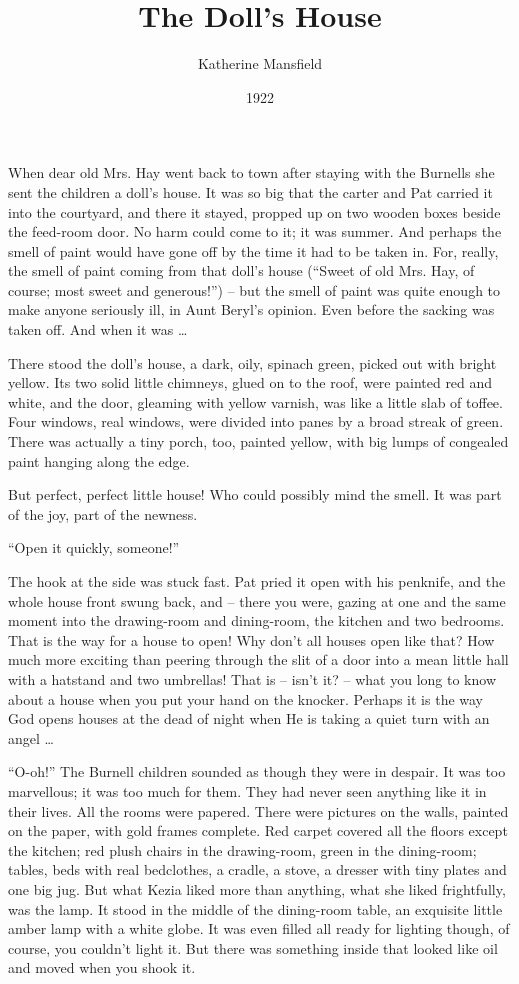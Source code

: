 \documentclass[10pt,a4paper]{article}
\begin{document}
\title{The Doll’s House}
\date{1922}
\author{Katherine Mansfield}
\maketitle


\linenumbers
When dear old Mrs. Hay went back to town after staying with the Burnells she sent the children a doll’s house. It was so big that the carter and Pat carried it into the courtyard, and there it stayed, propped up on two wooden boxes beside the feed-room door. No harm could come to it; it was summer. And perhaps the smell of paint would have gone off by the time it had to be taken in. For, really, the smell of paint coming from that doll’s house (“Sweet of old Mrs. Hay, of course; most sweet and generous!”) – but the smell of paint was quite enough to make anyone seriously ill, in Aunt Beryl’s opinion. Even before the sacking was taken off. And when it was …

There stood the doll’s house, a dark, oily, spinach green, picked out with bright yellow. Its two solid little chimneys, glued on to the roof, were painted red and white, and the door, gleaming with yellow varnish, was like a little slab of toffee. Four windows, real windows, were divided into panes by a broad streak of green. There was actually a tiny porch, too, painted yellow, with big lumps of congealed paint hanging along the edge.

But perfect, perfect little house! Who could possibly mind the smell. It was part of the joy, part of the newness.

“Open it quickly, someone!”

The hook at the side was stuck fast. Pat pried it open with his penknife, and the whole house front swung back, and – there you were, gazing at one and the same moment into the drawing-room and dining-room, the kitchen and two bedrooms. That is the way for a house to open! Why don’t all houses open like that? How much more exciting than peering through the slit of a door into a mean little hall with a hatstand and two umbrellas! That is – isn’t it? – what you long to know about a house when you put your hand on the knocker. Perhaps it is the way God opens houses at the dead of night when He is taking a quiet turn with an angel …

“O-oh!” The Burnell children sounded as though they were in despair. It was too marvellous; it was too much for them. They had never seen anything like it in their lives. All the rooms were papered. There were pictures on the walls, painted on the paper, with gold frames complete. Red carpet covered all the floors except the kitchen; red plush chairs in the drawing-room, green in the dining-room; tables, beds with real bedclothes, a cradle, a stove, a dresser with tiny plates and one big jug. But what Kezia liked more than anything, what she liked frightfully, was the lamp. It stood in the middle of the dining-room table, an exquisite little amber lamp with a white globe. It was even filled all ready for lighting though, of course, you couldn’t light it. But there was something inside that looked like oil and moved when you shook it.
\end{document}

